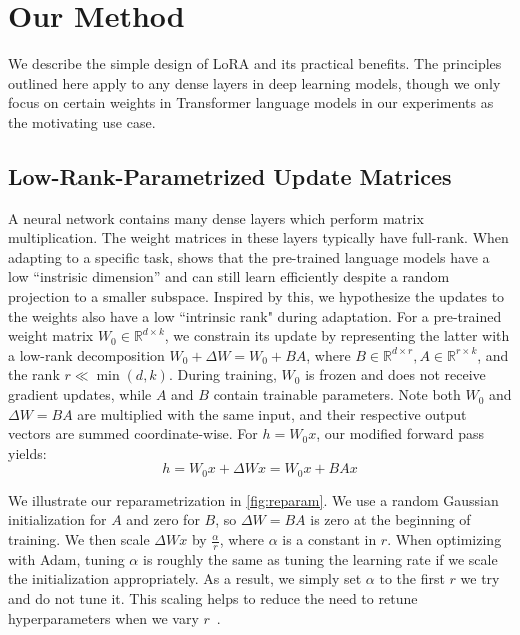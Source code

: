 \section{Our Method}

We describe the simple design of LoRA and its practical benefits.
The principles outlined here apply to any dense layers in deep learning models, though we only focus on certain weights in Transformer language models in our experiments as the motivating use case.

\subsection{Low-Rank-Parametrized Update Matrices}
A neural network contains many dense layers which perform matrix multiplication.
The weight matrices in these layers typically have full-rank.
When adapting to a specific task, \citet{aghajanyan_intrinsic_2020} shows that the pre-trained language models have a low ``instrisic dimension'' and can still learn efficiently despite a random projection to a smaller subspace.
Inspired by this, we hypothesize the updates to the weights also have a low ``intrinsic rank" during adaptation.
For a pre-trained weight matrix $W_0\in \mathbb{R}^{d\times k}$, we constrain its update by representing the latter with a low-rank decomposition $W_0+\Delta W=W_0+BA$, where $B\in \mathbb{R}^{d\times r}, A\in \mathbb{R}^{r\times k}$, and the rank $r \ll \min(d,k)$.
During training, $W_0$ is frozen and does not receive gradient updates, while $A$ and $B$ contain trainable parameters.
Note both $W_0$ and $\Delta W=BA$ are multiplied with the same input, and their respective output vectors are summed coordinate-wise.
For $h = W_0x$, our modified forward pass yields:
\begin{equation}
h = W_0 x + \Delta W x = W_0 x + BA x
\label{eq:lora}
\end{equation}

We illustrate our reparametrization in \autoref{fig:reparam}.
We use a random Gaussian initialization for $A$ and zero for $B$, so $\Delta W=BA$ is zero at the beginning of training.
We then scale $\Delta W x$ by $\frac{\alpha}{r}$, where $\alpha$ is a constant in $r$.
When optimizing with Adam, tuning $\alpha$ is roughly the same as tuning the learning rate if we scale the initialization appropriately.
As a result, we simply set $\alpha$ to the first $r$ we try and do not tune it.
This scaling helps to reduce the need to retune hyperparameters when we vary $r$~\citep{yang_feature_2021}.

